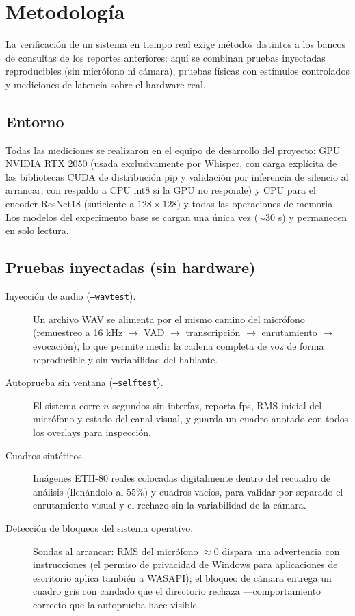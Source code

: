 \section{Metodología}
\label{sec:metodologia}

La verificación de un sistema en tiempo real exige métodos distintos a los bancos de
consultas de los reportes anteriores: aquí se combinan pruebas inyectadas
reproducibles (sin micrófono ni cámara), pruebas físicas con estímulos controlados y
mediciones de latencia sobre el hardware real.

\subsection{Entorno}

Todas las mediciones se realizaron en el equipo de desarrollo del proyecto: GPU
NVIDIA RTX 2050 (usada exclusivamente por Whisper, con carga explícita de las
bibliotecas CUDA de distribución pip y validación por inferencia de silencio al
arrancar, con respaldo a CPU int8 si la GPU no responde) y CPU para el encoder
ResNet18 (suficiente a $128\times128$) y todas las operaciones de memoria.
Los modelos del experimento base se cargan una única vez ($\sim$30 s) y permanecen en
solo lectura.

\subsection{Pruebas inyectadas (sin hardware)}

\begin{description}
    \item[Inyección de audio (\texttt{--wavtest}).] Un archivo WAV se alimenta por el
    mismo camino del micrófono (remuestreo a 16 kHz $\to$ VAD $\to$ transcripción
    $\to$ enrutamiento $\to$ evocación), lo que permite medir la cadena completa de
    voz de forma reproducible y sin variabilidad del hablante.

    \item[Autoprueba sin ventana (\texttt{--selftest}).] El sistema corre $n$ segundos
    sin interfaz, reporta fps, RMS inicial del micrófono y estado del canal visual, y
    guarda un cuadro anotado con todos los overlays para inspección.

    \item[Cuadros sintéticos.] Imágenes ETH-80 reales colocadas digitalmente dentro
    del recuadro de análisis (llenándolo al 55\%) y cuadros vacíos, para validar por
    separado el enrutamiento visual y el rechazo sin la variabilidad de la cámara.

    \item[Detección de bloqueos del sistema operativo.] Sondas al arrancar: RMS del
    micrófono $\approx 0$ dispara una advertencia con instrucciones (el permiso de
    privacidad de Windows para aplicaciones de escritorio aplica también a WASAPI); el
    bloqueo de cámara entrega un cuadro gris con candado que el directorio rechaza
    ---comportamiento correcto que la autoprueba hace visible.
\end{description}

